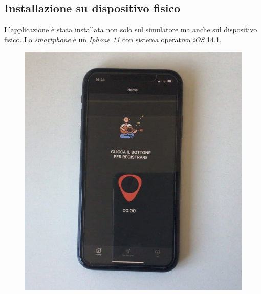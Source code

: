 \subsection{Installazione su dispositivo fisico}
L'applicazione è stata installata non solo sul simulatore ma anche sul dispositivo fisico. Lo \textit{smartphone} è un \textit{Iphone 11} con sistema operativo \textit{iOS} 14.1.
\begin{figure}[H]
	\centering
	\includegraphics[scale=0.40]{./images/img21.jpg}
\end{figure}